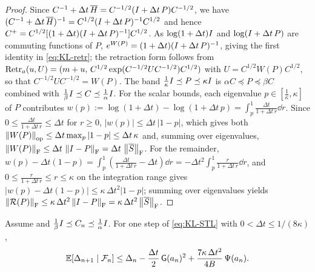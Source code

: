 \begin{proof}
Since $C^{-1}+\Delta t\,\overline H=C^{-1/2}(I+\Delta t\,P)C^{-1/2}$, we have
$(C^{-1}+\Delta t\,\overline H)^{-1}=C^{1/2}(I+\Delta t\,P)^{-1}C^{1/2}$ and hence
$C^+=C^{1/2}[(1+\Delta t)(I+\Delta t\,P)^{-1}]C^{1/2}$. As $\log(1+\Delta t)I$ and $\log(I+\Delta t\,P)$
are commuting functions of $P$, $e^{W(P)}=(1+\Delta t)(I+\Delta t\,P)^{-1}$, giving the first identity
in \eqref{eq:KL-retr}; the retraction form follows from
$\operatorname{Retr}_a(u,U)=(m+u,\,C^{1/2}\exp(C^{-1/2}UC^{-1/2})C^{1/2})$ with $U=C^{1/2}W(P)C^{1/2}$, so that
$C^{-1/2}UC^{-1/2}=W(P)$. The band $\tfrac1\kappa I\preceq P\preceq\kappa I$ is
$\alpha C\preceq P\preceq\beta C$ combined with $\tfrac1\beta I\preceq C\preceq\tfrac1\alpha I$.
For the scalar bounds, each eigenvalue $p\in[\tfrac1\kappa,\kappa]$ of $P$ contributes
$w(p):=\log(1+\Delta t)-\log(1+\Delta t\,p)=\int_p^1\frac{\Delta t}{1+\Delta t\,r}\dd r$. Since
$0\leq\tfrac{\Delta t}{1+\Delta t\,r}\leq\Delta t$ for $r\geq0$, $|w(p)|\leq\Delta t\,|1-p|$, which gives both
$\left\lVert W(P)\right\rVert_{\mathrm{op}}\leq\Delta t\max_p|1-p|\leq\Delta t\,\kappa$ and, summing over eigenvalues,
$\left\lVert W(P)\right\rVert_{\mathrm{F}}\leq\Delta t\,\left\lVert I-P\right\rVert_{\mathrm{F}}=\Delta t\,\left\lVert \overline S\right\rVert_{\mathrm{F}}$. For the
remainder, $w(p)-\Delta t(1-p)=\int_p^1(\tfrac{\Delta t}{1+\Delta t\,r}-\Delta t)\dd r=-\Delta t^2\int_p^1\tfrac{r}{1+\Delta t\,r}\dd r$,
and $0\leq\tfrac{r}{1+\Delta t\,r}\leq r\leq\kappa$ on the integration range gives
$|w(p)-\Delta t(1-p)|\leq\kappa\,\Delta t^2|1-p|$; summing over eigenvalues yields
$\left\lVert \mathcal R(P)\right\rVert_{\mathrm{F}}\leq\kappa\,\Delta t^2\left\lVert I-P\right\rVert_{\mathrm{F}}=\kappa\,\Delta t^2\left\lVert \overline S\right\rVert_{\mathrm{F}}$.
\end{proof}

\begin{lemma}
\label{lem:KL-onestep-stoch}
Assume  and $\tfrac1\beta I\preceq C_n\preceq\tfrac1\alpha I$. For
one step of \eqref{eq:KL-STL} with $0<\Delta t\leq1/(8\kappa)$,
\begin{equation}
\label{eq:KL-onestep-Psi}
    \mathbb{E}[\Delta_{n+1}\mid\mathcal{F}_n]
    \leq\Delta_n-\frac{\Delta t}2\,\mathsf{G}(a_n)^2
    +\frac{7\kappa\,\Delta t^2}{4B}\,\Psi(a_n).
\end{equation}
\end{lemma}

